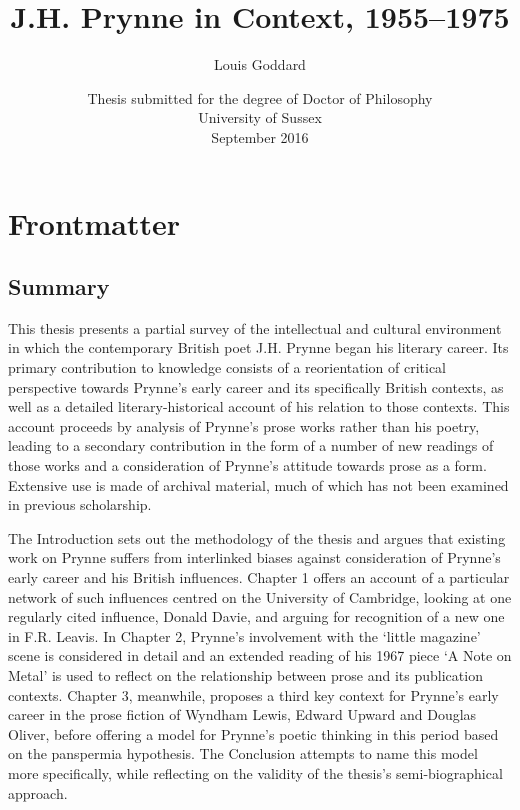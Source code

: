 \documentclass[]{article}
\date{}
\begin{document}
\newpage


\begin{titlepage}
\title{J.H. Prynne in Context, 1955--1975}
\author{Louis Goddard}
\date{\vfill Thesis submitted for the degree of Doctor of Philosophy\\
    University of Sussex\\
    September 2016}
\maketitle
\end{titlepage}

\newpage

 \tableofcontents
\newpage

\section{Frontmatter}\label{frontmatter}

\subsection{Summary}\label{summary}

\noindent This thesis presents a partial survey of the intellectual and
cultural environment in which the contemporary British poet J.H. Prynne
began his literary career. Its primary contribution to knowledge
consists of a reorientation of critical perspective towards Prynne’s
early career and its specifically British contexts, as well as a
detailed literary-historical account of his relation to those contexts.
This account proceeds by analysis of Prynne’s prose works rather than
his poetry, leading to a secondary contribution in the form of a number
of new readings of those works and a consideration of Prynne’s attitude
towards prose as a form. Extensive use is made of archival material,
much of which has not been examined in previous scholarship.

The Introduction sets out the methodology of the thesis and argues that
existing work on Prynne suffers from interlinked biases against
consideration of Prynne’s early career and his British influences.
Chapter 1 offers an account of a particular network of such influences
centred on the University of Cambridge, looking at one regularly cited
influence, Donald Davie, and arguing for recognition of a new one in
F.R. Leavis. In Chapter 2, Prynne’s involvement with the ‘little
magazine’ scene is considered in detail and an extended reading of his
1967 piece ‘A Note on Metal’ is used to reflect on the relationship
between prose and its publication contexts. Chapter 3, meanwhile,
proposes a third key context for Prynne’s early career in the prose
fiction of Wyndham Lewis, Edward Upward and Douglas Oliver, before
offering a model for Prynne’s poetic thinking in this period based on
the panspermia hypothesis. The Conclusion attempts to name this model
more specifically, while reflecting on the validity of the thesis’s
semi-biographical approach.
\end{document}
